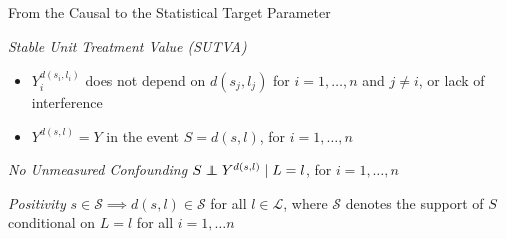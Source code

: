\documentclass{beamer}
\begin{document}
\begin{frame}[c]{From the Causal to the Statistical Target Parameter}

\begin{center}
\begin{tcolorbox}
\begin{assumption}{1}{\textit{Stable Unit Treatment Value (SUTVA)}}\label{sutva}
  \begin{itemize}
    \itemsep2pt
    \item $Y^{d(s_i, l_i)}_i$ does not depend on $d(s_j, l_j)$ for
        $i = 1, \ldots, n$ and $j \neq i$, or lack of
        interference~\citep{cox1958planning}
     \item $Y^{d(s, l)} = Y$ in the event $S = d(s, l)$, for $i = 1, \ldots, n$
  \end{itemize}
\end{assumption}
\end{tcolorbox}
\vspace{-0.7em}
\begin{tcolorbox}
\begin{assumption}{2}{\textit{No Unmeasured Confounding}}\label{ignorability}
  $S \indep Y^{d(s, l)} \mid L = l$, for $i = 1, \ldots, n$
\end{assumption}
\end{tcolorbox}
\vspace{-0.7em}
\begin{tcolorbox}
\begin{assumption}{3}{\textit{Positivity}}\label{positivity}
  $s \in \mathcal{S} \implies d(s, l) \in \mathcal{S}$ for all
  $l \in \mathcal{L}$, where $\mathcal{S}$ denotes the support of $S$
  conditional on $L = l$ for all $i = 1, \ldots n$
\end{assumption}
\end{tcolorbox}
\end{center}


\end{frame}
\end{document}

